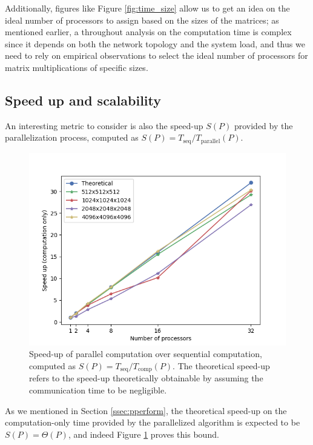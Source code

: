 Additionally, figures like Figure \ref{fig:time_size} allow us to get an idea on the ideal number of processors to assign based on the sizes of the matrices; as mentioned earlier, a throughout analysis on the computation time is complex since it depends on both the network topology and the system load, and thus we need to rely on empirical observations to select the ideal number of processors for matrix multiplications of specific sizes.

\subsection{Speed up and scalability}

An interesting metric to consider is also the speed-up $S(P)$ provided by the parallelization process, computed as $S(P) = T_{\text{seq}}/T_{\text{parallel}}(P)$.

\begin{figure}[ht!]
    \centering
    \includegraphics[width=0.8\linewidth]{figures/speedup_comp.png}
    \caption{Speed-up of parallel computation over sequential computation, computed as $S(P) = T_{\text{seq}}/T_{\text{comp}}(P)$. The theoretical speed-up refers to the speed-up theoretically obtainable by assuming the communication time to be negligible.}
    \label{fig:speedup_comp}
\end{figure}

As we mentioned in Section \ref{ssec:pperform}, the theoretical speed-up on the computation-only time provided by the parallelized algorithm is expected to be $S(P) = \Theta(P)$, and indeed Figure \ref{fig:speedup_comp} proves this bound.

